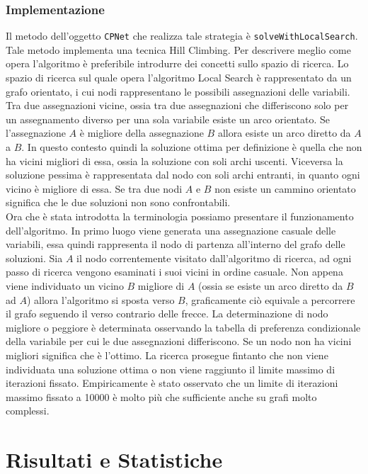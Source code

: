 \documentclass[a4paper,titlepage]{article}
\begin{document}
\subsubsection{Implementazione}
Il metodo dell'oggetto \texttt{CPNet} che realizza tale strategia è \texttt{solveWithLocalSearch}. Tale metodo implementa una tecnica Hill Climbing. Per descrivere meglio come opera l'algoritmo è preferibile introdurre dei concetti sullo spazio di ricerca. Lo spazio di ricerca sul quale opera l'algoritmo Local Search è rappresentato da un grafo orientato, i cui nodi rappresentano le possibili assegnazioni delle variabili. Tra due assegnazioni vicine, ossia tra due assegnazioni che differiscono solo per un assegnamento diverso per una sola variabile esiste un arco orientato. Se l'assegnazione $A$ è migliore della assegnazione $B$ allora esiste un arco diretto da $A$ a $B$. In questo contesto quindi la soluzione ottima per definizione è quella che non ha vicini migliori di essa, ossia la soluzione con soli archi uscenti. Viceversa la soluzione pessima è rappresentata dal nodo con soli archi entranti, in quanto ogni vicino è migliore di essa. Se tra due nodi $A$ e $B$ non esiste un cammino orientato significa che le due soluzioni non sono confrontabili.\\
Ora che è stata introdotta la terminologia possiamo presentare il funzionamento dell'algoritmo. In primo luogo viene generata una assegnazione casuale delle variabili, essa quindi rappresenta il nodo di partenza all'interno del grafo delle soluzioni. Sia $A$ il nodo correntemente visitato dall'algoritmo di ricerca, ad ogni passo di ricerca vengono esaminati i suoi vicini in ordine casuale. Non appena viene individuato un vicino $B$ migliore di $A$ (ossia se esiste un arco diretto da $B$ ad $A$) allora l'algoritmo si sposta verso $B$, graficamente ciò equivale a percorrere il grafo seguendo il verso contrario delle frecce. La determinazione di nodo migliore o peggiore è determinata osservando la tabella di preferenza condizionale della variabile per cui le due assegnazioni differiscono. Se un nodo non ha vicini migliori significa che è l'ottimo. La ricerca prosegue fintanto che non viene individuata una soluzione ottima o non viene raggiunto il limite massimo di iterazioni fissato. Empiricamente è stato osservato che un limite di iterazioni massimo fissato a 10000 è molto più che sufficiente anche su grafi molto complessi.


\section{Risultati e Statistiche}
\end{document}
